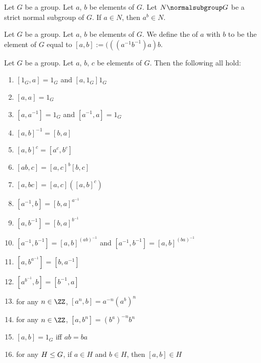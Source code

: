 \begin{theorem}
Let $G$ be a group.
Let $a$, $b$ be elements of $G$.
Let $N\normalsubgroup G$ be a strict normal subgroup of $G$.
If $a\in N$, then $a^{b}\in N$.
\end{theorem}

\begin{definition}
Let $G$ be a group. Let $a$, $b$ be elements of $G$.
We define the  of $a$ with $b$ to be the element of
$G$ equal to $[a,b]:=(((a^{-1}b^{-1})a)b$.
\end{definition}

\begin{theorem}
Let $G$ be a group.
Let $a$, $b$, $c$ be elements of $G$. Then the following all hold:
\begin{enumerate}
\item{} $[1_{G},a]=1_{G}$ and $[a,1_{G}]1_{G}$
\item{} $[a,a]=1_{G}$
\item{} $[a,a^{-1}]=1_{G}$ and $[a^{-1},a]=1_{G}$
\item{} $[a,b]^{-1}=[b,a]$
\item{} $[a,b]^{c}=[a^{c},b^{c}]$
\item{} $[ab,c]=[a,c]^{b}[b,c]$
\item{} $[a,bc]=[a,c]([a,b]^{c})$
\item{} $[a^{-1},b]=[b,a]^{a^{-1}}$
\item{} $[a,b^{-1}]=[b,a]^{b^{-1}}$
\item{} $[a^{-1},b^{-1}]=[a,b]^{(ab)^{-1}}$ and $[a^{-1},b^{-1}]=[a,b]^{(ba)^{-1}}$
\item{} $[a,b^{a^{-1}}]=[b,a^{-1}]$
\item{} $[a^{b^{-1}},b]=[b^{-1},a]$
\item{} for any $n\in\ZZ$, $[a^{n},b]=a^{-n}(a^{b})^{n}$
\item{} for any $n\in\ZZ$, $[a,b^{n}]=(b^{a})^{-n}b^{n}$
\item{} $[a,b]=1_{G}$ iff $ab=ba$
\item{} for any $H\leq G$, if $a\in H$ and $b\in H$,
  then $[a,b]\in H$
\end{enumerate}
\end{theorem}

